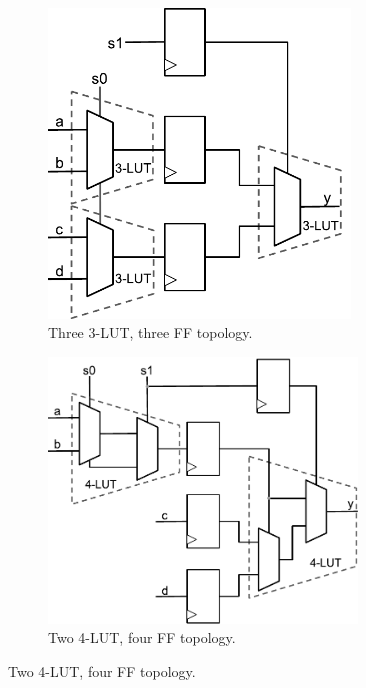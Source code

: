 \begin{figure}[tb]
    \begin{subfigure}{0.31\textwidth}
        \centering
        \includegraphics[width=0.88\textwidth]{img/mux_4_1.pdf}
        \caption{Three 3-LUT, three FF topology.}\label{fig:retiming:a}
    \end{subfigure}
    \begin{subfigure}{0.38\textwidth}
        \centering
        \includegraphics[width=0.9\textwidth]{img/mux_4_1_retime_dsd.pdf}
        \caption{Two 4-LUT, four FF topology.}\label{fig:retiming:b}

\end{subfigure}
\end{figure}
